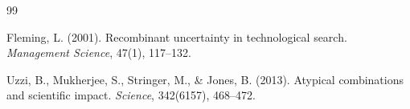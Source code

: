 \begin{thebibliography}{99}

Fleming, L. (2001). Recombinant uncertainty in technological search.
\emph{Management Science}, 47(1), 117--132.

Uzzi, B., Mukherjee, S., Stringer, M., \& Jones, B. (2013). Atypical
combinations and scientific impact. \emph{Science}, 342(6157), 468--472.

\end{thebibliography}

